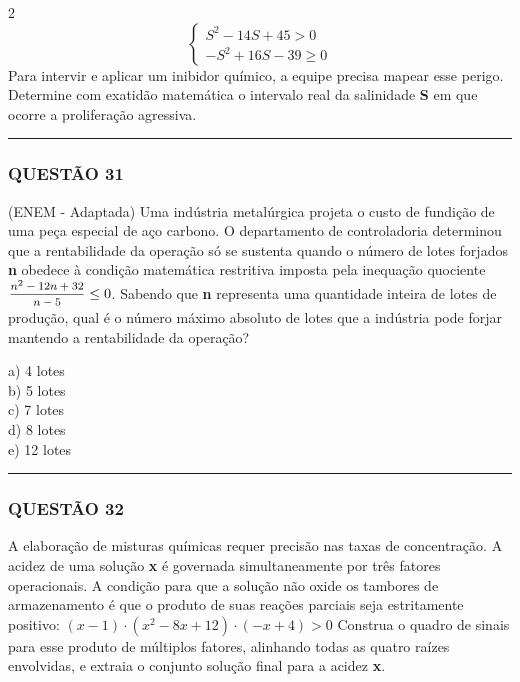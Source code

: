\documentclass[11pt, a4paper]{article}
\begin{document}
\begin{multicols*}{2}
$$ \begin{cases} S^2 - 14S + 45 > 0 \\ -S^2 + 16S - 39 \ge 0 \end{cases} $$
Para intervir e aplicar um inibidor químico, a equipe precisa mapear esse perigo. Determine com exatidão matemática o intervalo real da salinidade \textbf{S} em que ocorre a proliferação agressiva.

\vspace{0cm} \noindent\textcolor{CorLinha}{\rule{\linewidth}{0.5pt}} \vspace{-0.2cm}
\subsubsection*{QUESTÃO 31}
(ENEM - Adaptada) Uma indústria metalúrgica projeta o custo de fundição de uma peça especial de aço carbono. O departamento de controladoria determinou que a rentabilidade da operação só se sustenta quando o número de lotes forjados \textbf{n} obedece à condição matemática restritiva imposta pela inequação quociente $ \mfrac{n^2 - 12n + 32}{n - 5} \le 0 $. Sabendo que \textbf{n} representa uma quantidade inteira de lotes de produção, qual é o número máximo absoluto de lotes que a indústria pode forjar mantendo a rentabilidade da operação?

a) 4 lotes\\[0.3cm]
b) 5 lotes\\[0.3cm]
c) 7 lotes\\[0.3cm]
d) 8 lotes\\[0.3cm]
e) 12 lotes\\[0.3cm]

\vspace{0cm} \noindent\textcolor{CorLinha}{\rule{\linewidth}{0.5pt}} \vspace{-0.2cm}
\subsubsection*{QUESTÃO 32}
A elaboração de misturas químicas requer precisão nas taxas de concentração. A acidez de uma solução \textbf{x} é governada simultaneamente por três fatores operacionais. A condição para que a solução não oxide os tambores de armazenamento é que o produto de suas reações parciais seja estritamente positivo:
$ (x - 1) \cdot (x^2 - 8x + 12) \cdot (-x + 4) > 0 $
Construa o quadro de sinais para esse produto de múltiplos fatores, alinhando todas as quatro raízes envolvidas, e extraia o conjunto solução final para a acidez \textbf{x}.


\end{multicols*}
\end{document}
